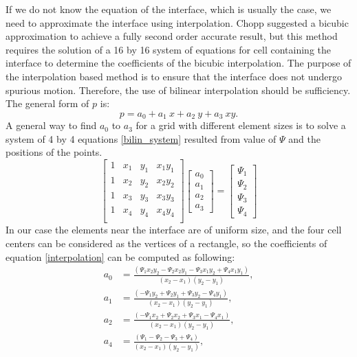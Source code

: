 \documentclass[review]{elsarticle}
\begin{document}
If we do not know the equation of the interface, which is usually the case, 
we need to approximate the interface using interpolation. Chopp suggested a bicubic approximation \cite{Chopp2001} to achieve a fully second order accurate 
result, but this method requires the solution of a 16 by 16 system of equations for cell containing the interface to determine the coefficients 
of the bicubic interpolation. 
The purpose of the interpolation based method is to ensure that the interface does not undergo spurious motion.
Therefore, the use of bilinear interpolation should be sufficiency. The general form of $p$ is:
\begin{equation}\label{interpolation}
p=a_0+a_1 \ x+ a_2 \ y+ a_3 \ xy.
\end{equation} 
A general way to find $a_0$ to $a_3$ for a grid with different element sizes is to solve a system of 4 by 4 equations \eqref{bilin_system} resulted from value of $\varPsi$ and the 
positions of the points. 
\begin{equation}
\label{bilin_system}
\begin{bmatrix}
    1 & x_1 & y_1 & x_1 y_1 \\
    1 & x_2 & y_2 & x_2 y_2 \\
    1 & x_3 & y_3 & x_3 y_3 \\
    1 & x_4 & y_4 & x_4 y_4 \\
\end{bmatrix}
\begin{bmatrix}
    a_0 \\
    a_1 \\
    a_2 \\
    a_3
\end{bmatrix}
=
\begin{bmatrix}
    \varPsi_1  \\
   \varPsi_2  \\
    \varPsi_3  \\
     \varPsi_4  
\end{bmatrix}
\end{equation} 
In our case the elements near the interface are of uniform size, and the four cell centers can be considered as the vertices of a rectangle, so the coefficients of 
equation \eqref{interpolation} can be computed as following:
\begin{subequations}
\begin{align}
a_0&=\frac{(\varPsi_1 x_2 y_2 - \varPsi_2 x_2 y_1 - \varPsi_3 x_1 y_2 + \varPsi_4 x_1 y_1)}{(x_2-x_1)(y_2-y_1)}, \\ 
a_1&=\frac{(-\varPsi_1 y_2 + \varPsi_2 y_1 + \varPsi_3 y_2 - \varPsi_4 y_1)}{(x_2-x_1)(y_2-y_1)},\\
a_2&=\frac{(-\varPsi_1 x_2 + \varPsi_2 x_2 + \varPsi_3 x_1 - \varPsi_4 x_1 )}{(x_2-x_1)(y_2-y_1)}, \\ 
a_4&=\frac{(\varPsi_1 - \varPsi_2 - \varPsi_3 + \varPsi_4)}{(x_2-x_1)(y_2-y_1)}, \\ 
\end{align}
\end{subequations}
\end{document}
